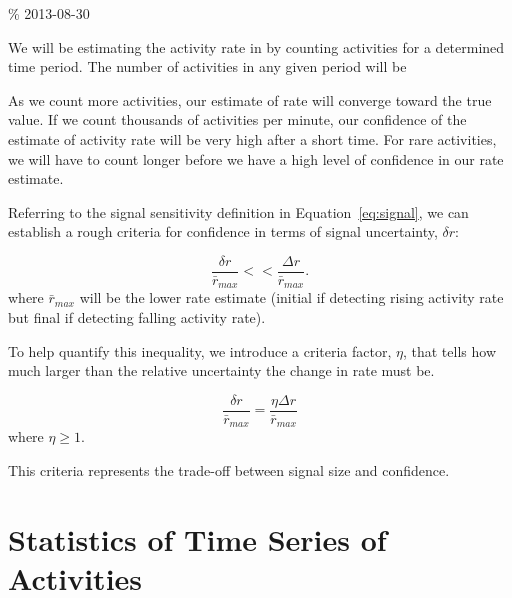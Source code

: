 \documentclass{article}
\begin{document}
\% 2013-08-30 

We will be estimating the activity rate in  by counting activities for a determined time period.  The
number of activities in any given period will be 




As we count more activities, our
estimate of rate will converge toward the true value.  If we count thousands of activities per minute, our confidence of the estimate
of activity rate will be very high after a short time.  For rare activities, we will have to count longer before we have
a high level of confidence in our rate estimate.

Referring to the signal sensitivity definition in Equation~\ref{eq:signal}, we can establish a rough criteria for confidence
in terms of signal uncertainty, $\delta r$:

\begin{equation}
    \label{eq:criteria}
    \frac{\delta r}{\bar{r}_{max}} << \frac{\Delta r}{\bar{r}_{max}}.
\end{equation}
where $\bar{r}_{max}$ will be the lower rate estimate (initial if detecting rising activity rate but final if detecting falling activity rate).


To help quantify this inequality, we introduce a criteria factor, $\eta$, that tells how much larger than the relative
uncertainty the change in rate must be.

\begin{equation}
    \label{eq:criteriaParam}
    \frac{\delta r}{\bar{r}_{max}} = \frac{\eta \Delta r}{\bar{r}_{max}}
\end{equation}
where $\eta \ge 1$.

This criteria represents the trade-off between signal size and confidence.

\section{Statistics of Time Series of Activities} 
\label{time}
\end{document}
